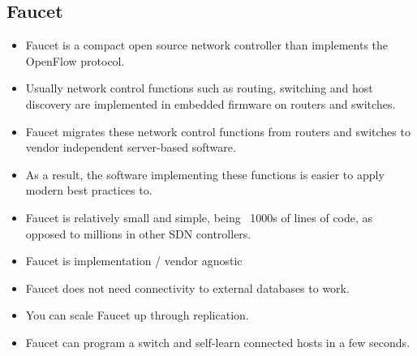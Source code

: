 \documentclass{article}
\begin{document}
\subsection{Faucet}
\begin{itemize}
    \item Faucet is a compact open source network controller than implements the OpenFlow protocol.
    \item Usually network control functions such as routing, switching and host discovery are implemented in embedded firmware on routers and switches.
    \item Faucet migrates these network control functions from routers and switches to vendor independent server-based software.  
    \item As a result, the software implementing these functions is easier to apply modern best practices to.
    \item Faucet is relatively small and simple, being ~1000s of lines of code, as opposed to millions in other SDN controllers.
    \item Faucet is implementation / vendor agnostic
    \item Faucet does not need connectivity to external databases to work.
    \item You can scale Faucet up through replication.
    \item Faucet can program a switch and self-learn connected hosts in a few seconds.
\end{itemize}
\end{document}
